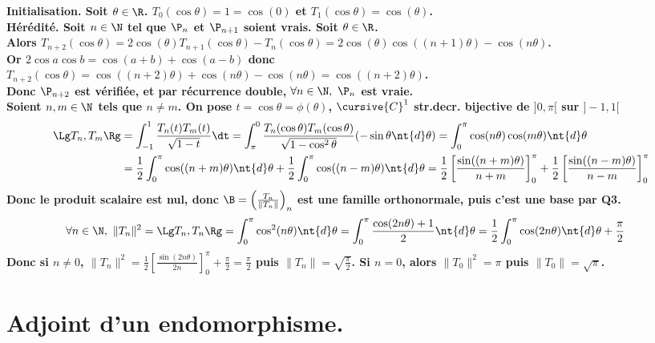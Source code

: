 \documentclass[11pt]{article}
\begin{document}
\begin{exercice}{}{}
    \bf{Initialisation.} Soit $\theta\in\R$. $T_0(\cos\theta)=1=\cos(0)$ et $T_1(\cos\theta)=\cos(\theta)$.\\
    \bf{Hérédité.} Soit $n\in\N$ tel que $\P_n$ et $\P_{n+1}$ soient vrais. Soit $\theta\in\R$.\\
    Alors $T_{n+2}(\cos\theta)=2\cos(\theta)T_{n+1}(\cos\theta)-T_n(\cos\theta)=2\cos(\theta)\cos((n+1)\theta)-\cos(n\theta)$.\\
    Or $2\cos a\cos b = \cos(a+b) + \cos(a-b)$ donc $T_{n+2}(\cos \theta)=\cos((n+2)\theta)+\cos(n\theta)-\cos(n\theta)=\cos((n+2)\theta)$.\\
    Donc $\P_{n+2}$ est vérifiée, et par récurrence double, $\forall n \in \N, ~ \P_n$ est vraie.\\
     Soient $n,m\in\N$ tels que $n\neq m$. On pose $t=\cos\theta=\phi(\theta)$, $\cursive{C}^1$ str.decr. bijective de $]0,\pi[$ sur $]-1,1[$
    \begin{align*}
        \Lg T_n, T_m \Rg &= \int_{-1}^1\frac{T_n(t)T_m(t)}{\sqrt{1-t}}\dt = \int_{\pi}^{0}\frac{T_n(\cos\theta)T_m(\cos\theta)}{\sqrt{1-\cos^2\theta}}(-\sin\theta\nt{d}\theta)=\int_0^{\pi}\cos(n\theta)\cos(m\theta)\nt{d}\theta\\
        &=\frac{1}{2}\int_0^{\pi}\cos((n+m)\theta)\nt{d}\theta + \frac{1}{2}\int_0^\pi\cos((n-m)\theta)\nt{d}\theta = \frac{1}{2}\left[ \frac{\sin((n+m)\theta)}{n+m} \right]_0^\pi + \frac{1}{2}\left[ \frac{\sin((n-m)\theta)}{n-m} \right]_0^\pi\\
    \end{align*}
    Donc le produit scalaire est nul, donc $\B=\left( \frac{T_n}{\|T_n\|} \right)_n$ est une famille orthonormale, puis c'est une base par Q3.
    \begin{align*}
        \forall n \in \N, ~ \|T_n\|^2 = \Lg T_n, T_n \Rg &= \int_0^\pi\cos^2(n\theta)\nt{d}\theta = \int_0^\pi\frac{\cos(2n\theta)+1}{2}\nt{d}\theta=\frac{1}{2}\int_0^\pi\cos(2n\theta)\nt{d}\theta + \frac{\pi}{2} 
    \end{align*}
    Donc si $n\neq0$, $\|T_n\|^2=\frac{1}{2}\left[ \frac{\sin(2n\theta)}{2n} \right]_0^\pi + \frac{\pi}{2}=\frac{\pi}{2}$ puis $\|T_n\|=\sqrt{\frac{\pi}{2}}$. Si $n=0$, alors $\|T_0\|^2=\pi$ puis $\|T_0\|=\sqrt{\pi}$.
\end{exercice}

\pagebreak

\section{Adjoint d'un endomorphisme.}
\end{document}
